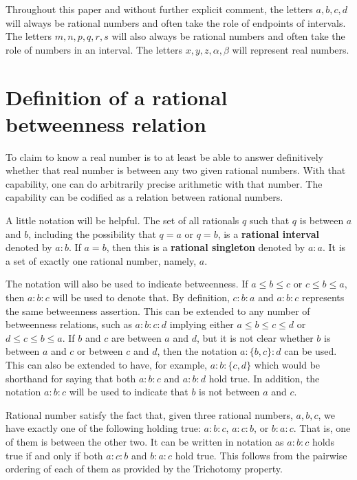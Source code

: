\documentclass[12pt]{article}
\begin{document}
Throughout this paper and without further explicit comment, the letters $a, b, c, d$ will always be rational numbers and often take the role of endpoints of intervals. The letters $m, n, p, q, r, s$ will also always be rational numbers and often take the role of numbers in an interval. The letters $x, y, z, \alpha, \beta$ will represent real numbers.

\section{Definition of a rational betweenness relation}

To claim to know a real number is to at least be able to answer definitively whether that real number is between any two given rational numbers. With that capability, one can do arbitrarily precise arithmetic with that number. The capability can be codified as a relation between rational numbers. 

A little notation will be helpful. The set of all rationals $q$ such that $q$ is between $a$ and $b$, including the possibility that $q=a$ or $q=b$, is a \textbf{rational interval} denoted by $a:b$. If $a=b$, then this is a \textbf{rational singleton} denoted by $a:a$. It is a set of exactly one rational number, namely, $a$. 

The notation will also be used to indicate betweenness. If $a \leq b \leq c$ or $c \leq b \leq a$, then $a:b:c$ will be used to denote that. By definition, $c:b:a$ and $a:b:c$ represents the same betweenness assertion. This can be extended to any number of betweenness relations, such as $a:b:c:d$ implying either $a \leq b \leq c \leq d$ or $d \leq c \leq b \leq a$. If $b$ and $c$ are between $a$ and $d$, but it is not clear whether $b$ is between $a$ and $c$ or between $c$ and $d$, then the notation $a:\{b,c\}:d$ can be used. This can also be extended to have, for example, $a:b:\{c,d\}$ which would be shorthand for saying that both $a:b:c$ and $a:b:d$ hold true. In addition, the notation \sout{$a:b:c$} will be used to indicate that $b$ is not between $a$ and $c$.

Rational number satisfy the fact that, given three rational numbers, $a, b, c$, we have exactly one of the following holding true: $a:b:c$, $a:c:b$, or $b:a:c$. That is, one of them is between the other two. It can be written in notation as $a:b:c$ holds true if and only if both \sout{$a:c:b$} and \sout{$b:a:c$} hold true. This follows from the pairwise ordering of each of them as provided by the Trichotomy property. 
\end{document}

